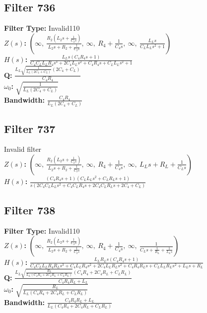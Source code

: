 \documentclass{article}
\begin{document}
\subsection*{Filter 736}
\textbf{Filter Type:} Invalid110 \\ 
\textbf{$Z(s)$:} $\left( \infty, \  \frac{R_{2} \left(L_{2} s + \frac{1}{C_{2} s}\right)}{L_{2} s + R_{2} + \frac{1}{C_{2} s}}, \  \infty, \  R_{4} + \frac{1}{C_{4} s}, \  \infty, \  \frac{L_{L} s}{C_{L} L_{L} s^{2} + 1}\right)$ \\ 
\textbf{$H(s)$:} $\frac{L_{L} s \left(C_{4} R_{4} s + 1\right)}{C_{4} C_{L} L_{L} R_{4} s^{3} + 2 C_{4} L_{L} s^{2} + C_{4} R_{4} s + C_{L} L_{L} s^{2} + 1}$ \\ 
\textbf{Q:} $\frac{L_{L} \sqrt{\frac{1}{L_{L} \left(2 C_{4} + C_{L}\right)}} \left(2 C_{4} + C_{L}\right)}{C_{4} R_{4}}$ \\ 
\textbf{$\omega_0$:} $\sqrt{\frac{1}{L_{L} \left(2 C_{4} + C_{L}\right)}}$ \\ 
\textbf{Bandwidth:} $\frac{C_{4} R_{4}}{L_{L} \left(2 C_{4} + C_{L}\right)}$ \\ 
\subsection*{Filter 737}
Invalid filter \\ 
\textbf{$Z(s)$:} $\left( \infty, \  \frac{R_{2} \left(L_{2} s + \frac{1}{C_{2} s}\right)}{L_{2} s + R_{2} + \frac{1}{C_{2} s}}, \  \infty, \  R_{4} + \frac{1}{C_{4} s}, \  \infty, \  L_{L} s + R_{L} + \frac{1}{C_{L} s}\right)$ \\ 
\textbf{$H(s)$:} $\frac{\left(C_{4} R_{4} s + 1\right) \left(C_{L} L_{L} s^{2} + C_{L} R_{L} s + 1\right)}{s \left(2 C_{4} C_{L} L_{L} s^{2} + C_{4} C_{L} R_{4} s + 2 C_{4} C_{L} R_{L} s + 2 C_{4} + C_{L}\right)}$ \\ 
\subsection*{Filter 738}
\textbf{Filter Type:} Invalid110 \\ 
\textbf{$Z(s)$:} $\left( \infty, \  \frac{R_{2} \left(L_{2} s + \frac{1}{C_{2} s}\right)}{L_{2} s + R_{2} + \frac{1}{C_{2} s}}, \  \infty, \  R_{4} + \frac{1}{C_{4} s}, \  \infty, \  \frac{1}{C_{L} s + \frac{1}{R_{L}} + \frac{1}{L_{L} s}}\right)$ \\ 
\textbf{$H(s)$:} $\frac{L_{L} R_{L} s \left(C_{4} R_{4} s + 1\right)}{C_{4} C_{L} L_{L} R_{4} R_{L} s^{3} + C_{4} L_{L} R_{4} s^{2} + 2 C_{4} L_{L} R_{L} s^{2} + C_{4} R_{4} R_{L} s + C_{L} L_{L} R_{L} s^{2} + L_{L} s + R_{L}}$ \\ 
\textbf{Q:} $\frac{L_{L} \sqrt{\frac{R_{L}}{L_{L} \left(C_{4} R_{4} + 2 C_{4} R_{L} + C_{L} R_{L}\right)}} \left(C_{4} R_{4} + 2 C_{4} R_{L} + C_{L} R_{L}\right)}{C_{4} R_{4} R_{L} + L_{L}}$ \\ 
\textbf{$\omega_0$:} $\sqrt{\frac{R_{L}}{L_{L} \left(C_{4} R_{4} + 2 C_{4} R_{L} + C_{L} R_{L}\right)}}$ \\ 
\textbf{Bandwidth:} $\frac{C_{4} R_{4} R_{L} + L_{L}}{L_{L} \left(C_{4} R_{4} + 2 C_{4} R_{L} + C_{L} R_{L}\right)}$ \\ 
\end{document}
